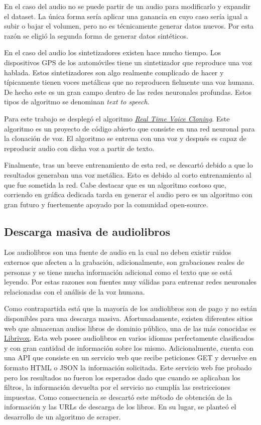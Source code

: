 En el caso del audio no se puede partir de un audio para modificarlo y expandir el \gls{dataset}. La única forma sería aplicar una ganancia en cuyo caso sería igual a subir o bajar el volumen, pero no es técnicamente generar datos nuevos. Por esta razón se eligió la segunda forma de generar datos sintéticos.

En el caso del audio los sintetizadores existen hace mucho tiempo. Los dispositivos \gls{GPS} de los automóviles tiene un sintetizador que reproduce una voz hablada. Estos sintetizadores son algo realmente complicado de hacer y típicamente tienen voces metálicas que no reproducen fielmente una voz humana. De hecho este es un gran campo dentro de las redes neuronales profundas. Estos tipos de algoritmo se denominan \textit{text to speech}.

Para este trabajo se desplegó el algoritmo \textit{\href{https://github.com/CorentinJ/Real-Time-Voice-Cloning}{Real Time Voice Cloning}}. Este algoritmo es un proyecto de código abierto que consiste en una red neuronal para la clonación de voz\cite{transfer_learning}. El algoritmo se entrena con una voz y después es capaz de reproducir audio con dicha voz a partir de texto.

Finalmente, tras un breve entrenamiento de esta red, se descartó debido a que lo resultados generaban una voz metálica. Esto es debido al corto entrenamiento al que fue sometida la red. Cabe destacar que es un algoritmo costoso que, corriendo en gráfica dedicada tarda en generar el audio pero es un algoritmo con gran futuro y fuertemente apoyado por la comunidad open-source.

\subsection{Descarga masiva de audiolibros}
Los audiolibros son una fuente de audio en la cual no deben existir ruidos externos que afecten a la grabación, adicionalmente, son grabaciones reales de personas y se tiene mucha información adicional como el texto que se está leyendo. Por estas razones son fuentes muy válidas para entrenar redes neuronales relacionadas con el análisis de la voz humana.

Como contrapartida está que la mayoría de los audiolibros son de pago y no están disponibles para una descarga masiva. Afortunadamente, existen diferentes sitios web que almacenan audios libros de dominio público, una de las más conocidas es \href{https://librivox.org/}{Librivox}. Esta web posee audiolibros en varios idiomas perfectamente clasificados y con gran cantidad de información sobre los mismo. Adicionalmente, cuenta con una \gls{API} que consiste en un servicio web que recibe peticiones \gls{GET} y devuelve en formato \gls{HTML} o \gls{JSON} la información solicitada. Este servicio web fue probado pero los resultados no fueron los esperados dado que cuando se aplicaban los filtros, la información devuelta por el servicio no cumplía las restricciones impuestas. Como consecuencia se descartó este método de obtención de la información y las \glspl{URL} de descarga de los libros. En su lugar, se planteó el desarrollo de un algoritmo de \gls{scraper}.

